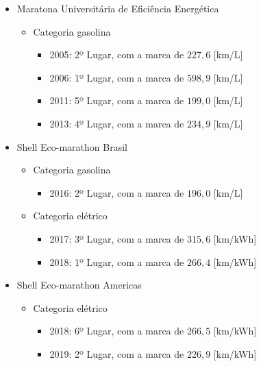 \begin{itemize}
    \item Maratona Universitária de Eficiência Energética
          \begin{itemize}
              \item  Categoria gasolina
                    \begin{itemize}
                        \item 2005: 2º Lugar, com a marca de $227,6$ [km/L]
                        \item 2006: 1º Lugar, com a marca de $598,9$ [km/L]
                        \item 2011: 5º Lugar, com a marca de $199,0$ [km/L]
                        \item 2013: 4º Lugar, com a marca de $234,9$ [km/L]
                    \end{itemize}
          \end{itemize}
    \item Shell Eco-marathon Brasil
          \begin{itemize}
              \item  Categoria gasolina
                    \begin{itemize}
                        \item 2016: 2º Lugar, com a marca de $196,0$ [km/L]
                    \end{itemize}
              \item  Categoria elétrico
                    \begin{itemize}
                        \item 2017: 3º Lugar, com a marca de $315,6$ [km/kWh]
                        \item 2018: 1º Lugar, com a marca de $266,4$ [km/kWh]
                    \end{itemize}
          \end{itemize}
    \item Shell Eco-marathon Americas
          \begin{itemize}
              \item  Categoria elétrico
                    \begin{itemize}
                        \item 2018: 6º Lugar, com a marca de $266,5$ [km/kWh]
                        \item 2019: 2º Lugar, com a marca de $226,9$ [km/kWh]
                    \end{itemize}
          \end{itemize}
\end{itemize}

